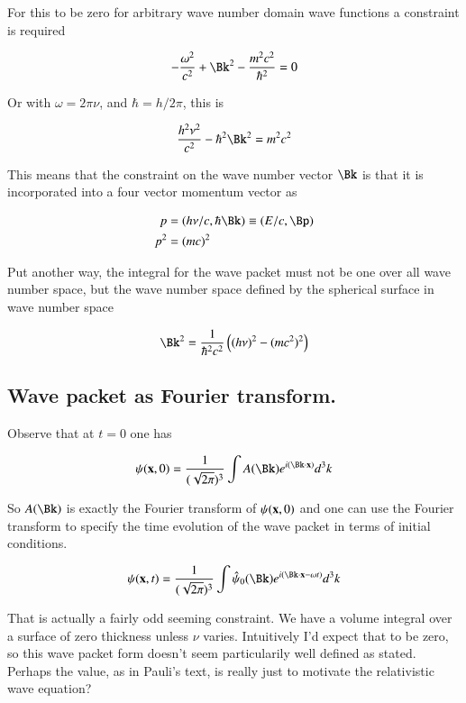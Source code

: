\documentclass{article}
\begin{document}
For this to be zero for arbitrary wave number domain wave functions a constraint is required

\begin{align*}
-\frac{\omega^2}{c^2} + \Bk^2 - \frac{m^2 c^2}{\hbar^2} = 0
\end{align*}

Or with $\omega = 2 \pi \nu$, and $\hbar = h/2\pi$, this is

\begin{align*}
\frac{h^2 \nu^2}{c^2} - \hbar^2 \Bk^2 = {m^2 c^2}
\end{align*}

This means that the constraint on the wave number vector $\Bk$ is that it is incorporated into a four vector momentum vector as

\begin{align*}
p &= (h \nu/c, \hbar \Bk) \equiv (E/c, \Bp)\\
p^2 &= (m c)^2
\end{align*}

Put another way, the integral for the wave packet must not be one over all wave number space, but the wave number space defined by the 
spherical surface in wave number space

\begin{align*}
\Bk^2 = \inv{\hbar^2 c^2 }\left( (h \nu)^2 - (m c^2)^2 \right)
\end{align*}

\subsection{ Wave packet as Fourier transform. }

Observe that at $t=0$ one has

\begin{align*}
\psi(\Bx,0) = \inv{(\sqrt{2\pi})^3}\int A(\Bk) e^{ i (\Bk \cdot \Bx)} d^3 k
\end{align*}

So $A(\Bk)$ is exactly the Fourier transform of $\psi(\mathbf{x},0)$ 
and one can
use the Fourier transform to specify the time evolution of the wave packet in terms of initial conditions.

\begin{align}
\psi(\Bx,t) = \inv{(\sqrt{2\pi})^3}\int \hat{\psi}_0(\Bk) e^{ i (\Bk \cdot \Bx - \omega t)} d^3 k
\end{align}

That is actually a fairly odd seeming constraint.  We have a volume integral over a surface of zero thickness unless $\nu$ varies.  Intuitively
I'd expect that to be zero, so this wave packet form doesn't seem particularily well defined as stated.  Perhaps the value, as
in Pauli's text, is really just to motivate the relativistic wave equation?
\end{document}
